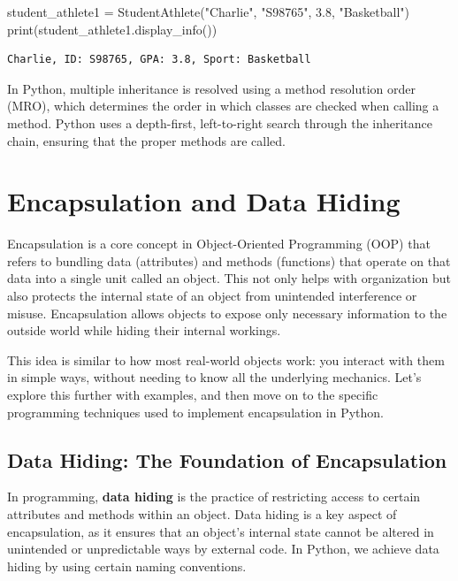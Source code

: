 \documentclass[
  letterpaper,
  DIV=11,
  numbers=noendperiod]{scrreprt}
\newenvironment{Shaded}{\begin{snugshade}}{\end{snugshade}}
\newcommand{\BuiltInTok}[1]{\textcolor[rgb]{0.00,0.23,0.31}{#1}}
\newcommand{\FloatTok}[1]{\textcolor[rgb]{0.68,0.00,0.00}{#1}}
\newcommand{\NormalTok}[1]{\textcolor[rgb]{0.00,0.23,0.31}{#1}}
\newcommand{\OperatorTok}[1]{\textcolor[rgb]{0.37,0.37,0.37}{#1}}
\newcommand{\StringTok}[1]{\textcolor[rgb]{0.13,0.47,0.30}{#1}}
\begin{document}
\begin{Shaded}
\begin{Highlighting}[]
\NormalTok{student\_athlete1 }\OperatorTok{=}\NormalTok{ StudentAthlete(}\StringTok{"Charlie"}\NormalTok{, }\StringTok{"S98765"}\NormalTok{, }\FloatTok{3.8}\NormalTok{, }\StringTok{"Basketball"}\NormalTok{)}
\BuiltInTok{print}\NormalTok{(student\_athlete1.display\_info())  }
\end{Highlighting}
\end{Shaded}

\begin{verbatim}
Charlie, ID: S98765, GPA: 3.8, Sport: Basketball
\end{verbatim}

In Python, multiple inheritance is resolved using a method resolution
order (MRO), which determines the order in which classes are checked
when calling a method. Python uses a depth-first, left-to-right search
through the inheritance chain, ensuring that the proper methods are
called.

\hypertarget{encapsulation-and-data-hiding}{%
\section{Encapsulation and Data
Hiding}\label{encapsulation-and-data-hiding}}

Encapsulation is a core concept in Object-Oriented Programming (OOP)
that refers to bundling data (attributes) and methods (functions) that
operate on that data into a single unit called an object. This not only
helps with organization but also protects the internal state of an
object from unintended interference or misuse. Encapsulation allows
objects to expose only necessary information to the outside world while
hiding their internal workings.

This idea is similar to how most real-world objects work: you interact
with them in simple ways, without needing to know all the underlying
mechanics. Let's explore this further with examples, and then move on to
the specific programming techniques used to implement encapsulation in
Python.

\hypertarget{data-hiding-the-foundation-of-encapsulation}{%
\subsection{Data Hiding: The Foundation of
Encapsulation}\label{data-hiding-the-foundation-of-encapsulation}}

In programming, \textbf{data hiding} is the practice of restricting
access to certain attributes and methods within an object. Data hiding
is a key aspect of encapsulation, as it ensures that an object's
internal state cannot be altered in unintended or unpredictable ways by
external code. In Python, we achieve data hiding by using certain naming
conventions.
\end{document}
